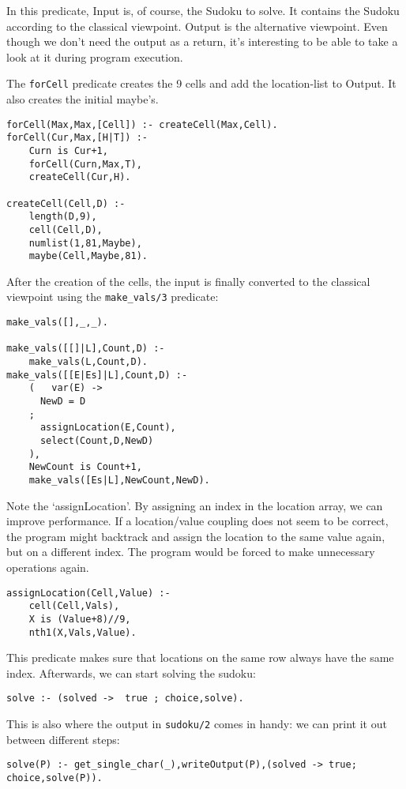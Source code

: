 In this predicate, Input is, of course, the Sudoku to solve. It contains the Sudoku according to the classical viewpoint. Output is the alternative viewpoint. Even though we don't need the output as a return, it's interesting to be able to take a look at it during program execution.

The \verb|forCell| predicate creates the 9 cells and add the location-list to Output. It also creates the initial maybe's.
\begin{lstlisting}
forCell(Max,Max,[Cell]) :- createCell(Max,Cell).
forCell(Cur,Max,[H|T]) :-
	Curn is Cur+1,
	forCell(Curn,Max,T),
	createCell(Cur,H).

createCell(Cell,D) :-
	length(D,9),
	cell(Cell,D),
	numlist(1,81,Maybe),
	maybe(Cell,Maybe,81).
\end{lstlisting}

	
After the creation of the cells, the input is finally converted to the classical viewpoint using the \verb|make_vals/3| predicate:
\begin{lstlisting}
make_vals([],_,_).

make_vals([[]|L],Count,D) :-
	make_vals(L,Count,D).
make_vals([[E|Es]|L],Count,D) :-
	(   var(E) ->
	  NewD = D
	;
	  assignLocation(E,Count),
	  select(Count,D,NewD)
	),
	NewCount is Count+1,
	make_vals([Es|L],NewCount,NewD).
\end{lstlisting}	
Note the `assignLocation'. By assigning an index in the location array, we can improve performance. If a location/value coupling does not seem to be correct, the program might backtrack and assign the location to the same value again, but on a different index. The program would be forced to make unnecessary operations again.
\begin{lstlisting}
assignLocation(Cell,Value) :-
	cell(Cell,Vals),
	X is (Value+8)//9,
	nth1(X,Vals,Value).
\end{lstlisting}

This predicate makes sure that locations on the same row always have the same index. 
Afterwards, we can start solving the sudoku:
\begin{lstlisting}
solve :- (solved ->  true ; choice,solve).
\end{lstlisting}

This is also where the output in \verb|sudoku/2| comes in handy: we can print it out between different steps:

\begin{lstlisting}
solve(P) :- get_single_char(_),writeOutput(P),(solved -> true; choice,solve(P)).
\end{lstlisting}

